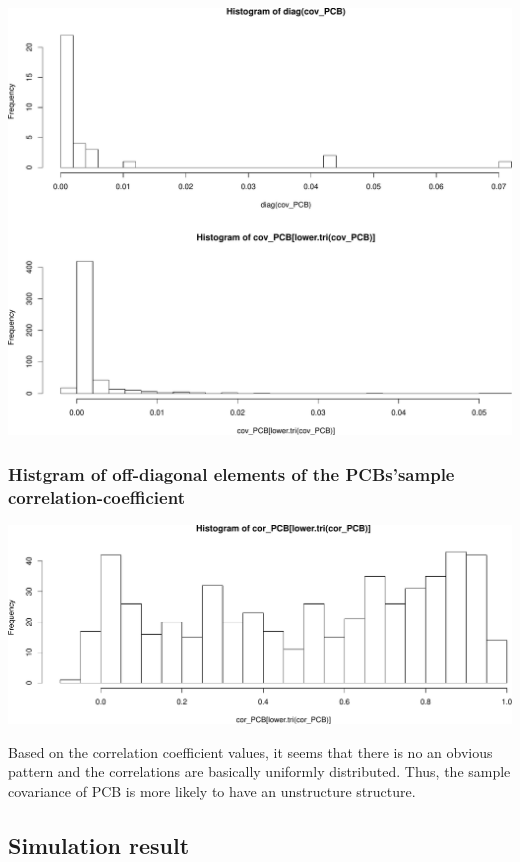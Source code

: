 \documentclass[]{article}
\begin{document}
\includegraphics{SVD_dim_red_simulation_study_files/figure-latex/unnamed-chunk-1-1.pdf}

\subsubsection{Histgram of off-diagonal elements of the PCBs'sample
correlation-coefficient}\label{histgram-of-off-diagonal-elements-of-the-pcbssample-correlation-coefficient}

\includegraphics{SVD_dim_red_simulation_study_files/figure-latex/unnamed-chunk-2-1.pdf}

Based on the correlation coefficient values, it seems that there is no
an obvious pattern and the correlations are basically uniformly
distributed. Thus, the sample covariance of PCB is more likely to have
an unstructure structure.

\subsection{Simulation result}\label{simulation-result}
\end{document}
